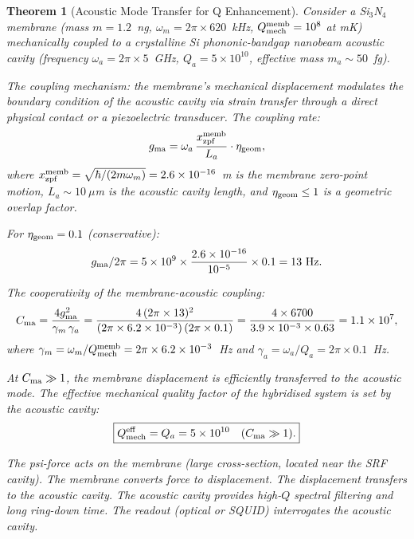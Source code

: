 \documentclass[11pt]{article}
\newcommand{\ee}[1]{\times 10^{#1}}
\newcommand{\Qmech}{Q_{\rm mech}}
\newtheorem{theorem}{Theorem}[section]
\theoremstyle{definition}
\theoremstyle{remark}
\begin{document}
\begin{theorem}[Acoustic Mode Transfer for Q Enhancement]
\label{thm:acoustic_transfer}
Consider a Si$_3$N$_4$ membrane (mass $m = 1.2$~ng, $\omega_m = 2\pi
\times 620$~kHz, $\Qmech^{\rm memb} = 10^8$ at mK) mechanically
coupled to a crystalline Si phononic-bandgap nanobeam acoustic cavity
(frequency $\omega_a = 2\pi \times 5$~GHz, $Q_a = 5\ee{10}$,
effective mass $m_a \sim 50$~fg).

The coupling mechanism: the membrane's mechanical displacement
modulates the boundary condition of the acoustic cavity via
strain transfer through a direct physical contact or a piezoelectric
transducer. The coupling rate:
\begin{equation}
g_{\rm ma} = \omega_a\,\frac{x_{\rm zpf}^{\rm memb}}{L_a}
\cdot \eta_{\rm geom},
\label{eq:coupling_rate}
\end{equation}
where $x_{\rm zpf}^{\rm memb} = \sqrt{\hbar/(2 m \omega_m)}
= 2.6\ee{-16}$~m is the membrane zero-point motion,
$L_a \sim 10~\mu$m is the acoustic cavity length, and
$\eta_{\rm geom} \leq 1$ is a geometric overlap factor.

For $\eta_{\rm geom} = 0.1$ (conservative):
\begin{equation}
g_{\rm ma}/2\pi = 5\ee{9} \times \frac{2.6\ee{-16}}{10^{-5}}
\times 0.1 = 13~\text{Hz}.
\end{equation}

The cooperativity of the membrane-acoustic coupling:
\begin{equation}
C_{\rm ma} = \frac{4 g_{\rm ma}^2}{\gamma_m\,\gamma_a}
= \frac{4\,(2\pi\times 13)^2}{(2\pi\times 6.2\ee{-3})\,(2\pi\times 0.1)}
= \frac{4\times 6700}{3.9\ee{-3}\times 0.63} = 1.1\ee{7},
\label{eq:cooperativity_ma}
\end{equation}
where $\gamma_m = \omega_m/\Qmech^{\rm memb} = 2\pi\times 6.2\ee{-3}$~Hz
and $\gamma_a = \omega_a/Q_a = 2\pi\times 0.1$~Hz.

At $C_{\rm ma} \gg 1$, the membrane displacement is efficiently
transferred to the acoustic mode. The effective mechanical quality
factor of the \emph{hybridised} system is set by the acoustic cavity:
\begin{equation}
\boxed{
\Qmech^{\rm eff} = Q_a = 5\ee{10} \quad (C_{\rm ma} \gg 1).
}
\label{eq:Qeff}
\end{equation}

The psi-force acts on the membrane (large cross-section, located
near the SRF cavity). The membrane converts force to displacement.
The displacement transfers to the acoustic cavity. The acoustic
cavity provides high-$Q$ spectral filtering and long ring-down
time. The readout (optical or SQUID) interrogates the acoustic
cavity.
\end{theorem}
\end{document}
